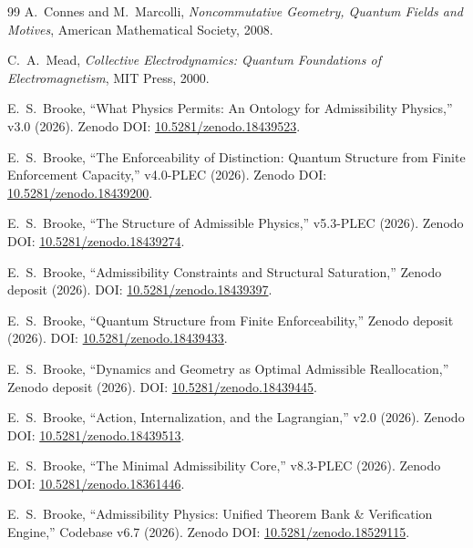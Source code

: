 \documentclass[11pt]{article}
\begin{document}
\begin{thebibliography}{99}
A.\ Connes and M.\ Marcolli, \emph{Noncommutative Geometry, Quantum Fields and Motives}, American Mathematical Society, 2008.

C.\ A.\ Mead, \emph{Collective Electrodynamics: Quantum Foundations of Electromagnetism}, MIT Press, 2000.

E.\ S.\ Brooke, ``What Physics Permits: An Ontology for Admissibility Physics,''
v3.0 (2026). Zenodo DOI: \href{https://doi.org/10.5281/zenodo.18439523}{10.5281/zenodo.18439523}.

E.\ S.\ Brooke, ``The Enforceability of Distinction: Quantum Structure from Finite Enforcement Capacity,''
v4.0-PLEC (2026). Zenodo DOI: \href{https://doi.org/10.5281/zenodo.18439200}{10.5281/zenodo.18439200}.

E.\ S.\ Brooke, ``The Structure of Admissible Physics,''
v5.3-PLEC (2026). Zenodo DOI: \href{https://doi.org/10.5281/zenodo.18439274}{10.5281/zenodo.18439274}.

E.\ S.\ Brooke, ``Admissibility Constraints and Structural Saturation,''
Zenodo deposit (2026). DOI: \href{https://doi.org/10.5281/zenodo.18439397}{10.5281/zenodo.18439397}.

E.\ S.\ Brooke, ``Quantum Structure from Finite Enforceability,''
Zenodo deposit (2026). DOI: \href{https://doi.org/10.5281/zenodo.18439433}{10.5281/zenodo.18439433}.

E.\ S.\ Brooke, ``Dynamics and Geometry as Optimal Admissible Reallocation,''
Zenodo deposit (2026). DOI: \href{https://doi.org/10.5281/zenodo.18439445}{10.5281/zenodo.18439445}.

E.\ S.\ Brooke, ``Action, Internalization, and the Lagrangian,''
v2.0 (2026). Zenodo DOI: \href{https://doi.org/10.5281/zenodo.18439513}{10.5281/zenodo.18439513}.

E.\ S.\ Brooke, ``The Minimal Admissibility Core,''
v8.3-PLEC (2026). Zenodo DOI: \href{https://doi.org/10.5281/zenodo.18361446}{10.5281/zenodo.18361446}.

E.\ S.\ Brooke, ``Admissibility Physics: Unified Theorem Bank \& Verification Engine,''
Codebase v6.7 (2026). Zenodo DOI: \href{https://doi.org/10.5281/zenodo.18529115}{10.5281/zenodo.18529115}.

\end{thebibliography}
\end{document}
